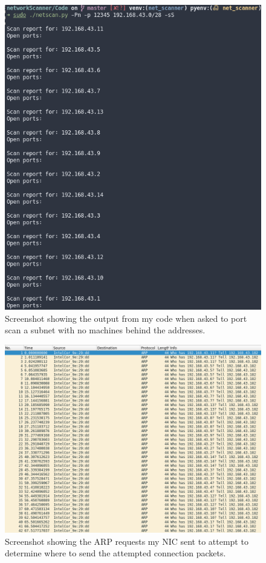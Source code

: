 \documentclass[titlepage]{article}
\begin{document}
\begin{figure}[H]
  \centering
  \includegraphics[width=\textwidth]{nocheckhostoutput.png}
  \caption{%
    Screenshot showing the output from my code when asked to port scan a subnet
    with no machines behind the addresses.
  }\label{nocheckoutput}
\end{figure}

\begin{figure}[H]
  \centering
  \includegraphics[width=\textwidth]{nocheckpcap.png}
  \caption{%
    Screenshot showing the ARP requests my NIC sent to attempt to determine
    where to send the attempted connection packets.
  }\label{nocheckwireshark}
\end{figure}
\end{document}

